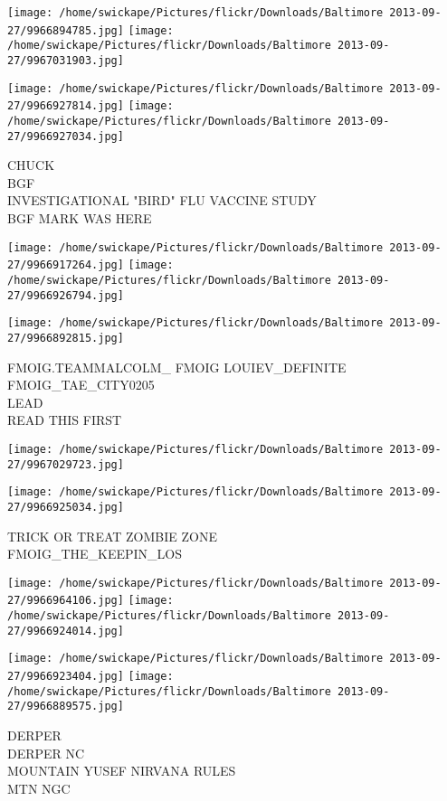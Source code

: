 \documentclass[10pt,letterpaper]{article}
\begin{document}
\texttt{[image: /home/swickape/Pictures/flickr/Downloads/Baltimore 2013-09-27/9966894785.jpg]}
\texttt{[image: /home/swickape/Pictures/flickr/Downloads/Baltimore 2013-09-27/9967031903.jpg]}

\texttt{[image: /home/swickape/Pictures/flickr/Downloads/Baltimore 2013-09-27/9966927814.jpg]}
\texttt{[image: /home/swickape/Pictures/flickr/Downloads/Baltimore 2013-09-27/9966927034.jpg]}

CHUCK\\
BGF\\
INVESTIGATIONAL "BIRD" FLU VACCINE STUDY\\
BGF MARK WAS HERE\\
\pagebreak

\texttt{[image: /home/swickape/Pictures/flickr/Downloads/Baltimore 2013-09-27/9966917264.jpg]}
\texttt{[image: /home/swickape/Pictures/flickr/Downloads/Baltimore 2013-09-27/9966926794.jpg]}

\texttt{[image: /home/swickape/Pictures/flickr/Downloads/Baltimore 2013-09-27/9966892815.jpg]}

FMOIG.TEAMMALCOLM\_ FMOIG LOUIEV\_DEFINITE FMOIG\_TAE\_CITY0205\\
LEAD\\
READ THIS FIRST\\
\pagebreak

\texttt{[image: /home/swickape/Pictures/flickr/Downloads/Baltimore 2013-09-27/9967029723.jpg]}

\vspace{0.25in}
\texttt{[image: /home/swickape/Pictures/flickr/Downloads/Baltimore 2013-09-27/9966925034.jpg]}

TRICK OR TREAT ZOMBIE ZONE\\
FMOIG\_THE\_KEEPIN\_LOS\\
\pagebreak

\texttt{[image: /home/swickape/Pictures/flickr/Downloads/Baltimore 2013-09-27/9966964106.jpg]}
\texttt{[image: /home/swickape/Pictures/flickr/Downloads/Baltimore 2013-09-27/9966924014.jpg]}

\texttt{[image: /home/swickape/Pictures/flickr/Downloads/Baltimore 2013-09-27/9966923404.jpg]}
\texttt{[image: /home/swickape/Pictures/flickr/Downloads/Baltimore 2013-09-27/9966889575.jpg]}

DERPER\\
DERPER NC\\
MOUNTAIN YUSEF NIRVANA RULES\\
MTN NGC\\
\pagebreak
\end{document}
